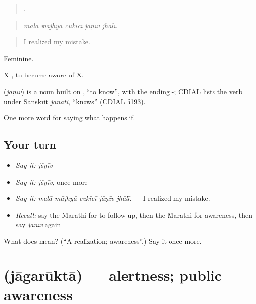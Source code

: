 \begin{quote}
    .
\end{quote}

\begin{quote}
\emph{malā mājhyā cukīcī jāṇīv jhālī.}
\end{quote}

\begin{quote}
I realized my mistake.
\end{quote}

Feminine.

X   , to become aware of X.

\begin{cousinweb}
\textbf{} (\emph{jāṇīv}) is a noun built on , \textquotedblleft{}to know\textquotedblright{}, with the ending -; CDIAL lists the verb under Sanskrit \emph{jānāti}, \textquotedblleft{}knows\textquotedblright{} (CDIAL 5193).
\end{cousinweb}

\begin{grammarlens}[title={What you've built}]
One more word for saying what happens if.
\end{grammarlens}

\subsection*{Your turn}
\begin{itemize}
\raggedright
  \item \emph{Say it:} \emph{jāṇīv}
  \item \emph{Say it:} \emph{jāṇīv}, once more
  \item \emph{Say it:} \emph{malā mājhyā cukīcī jāṇīv jhālī.} — I realized my mistake.
  \item \emph{Recall:} say the Marathi for to follow up, then the Marathi for awareness, then say \emph{jāṇīv} again
\end{itemize}

\begin{tcolorbox}[breakable,colback=teal!4,colframe=teal!35!black,title={Before you move on}]
What does  mean? (\textquotedblleft{}A realization; awareness\textquotedblright{}.) Say it once more.
\end{tcolorbox}
\section[\texorpdfstring{\mr{जागरूकता} (jāgarūktā)}{जागरूकता (jāgarūktā)}]{ (jāgarūktā) — alertness; public awareness}

